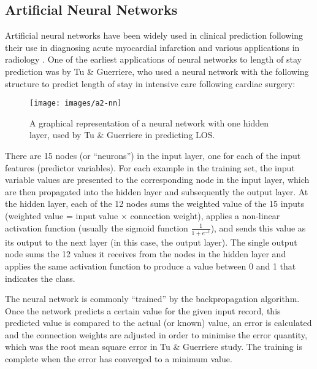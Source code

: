 \subsection{Artificial Neural Networks}
Artificial neural networks have been widely used in clinical prediction
following their use in diagnosing acute myocardial infarction and various
applications in radiology \citep{Baxt1995}.
One of the earliest applications of neural networks to
length of stay prediction was by Tu \& Guerriere, who used a neural network
with the following structure \citep{Tu1993} to predict length of stay in
intensive care following cardiac surgery:
\begin{figure}[h]
\centering
\texttt{[image: images/a2-nn]}
\caption{A graphical representation of a neural network with one hidden layer,
used by Tu \& Guerriere in predicting LOS.}
\end{figure}

There are 15 nodes (or ``neurons'') in the input layer, one for each of the
input features (predictor variables). For each example in the training set,
the input variable values are presented to the corresponding node in the input
layer, which are then propagated into the hidden layer and subsequently the
output layer. At the hidden layer, each of the 12 nodes sums the weighted
value of the 15 inputs (weighted value = input value $\times$ connection
weight), applies a non-linear activation function (usually the sigmoid function
$\frac{1}{1+e^{-t}}$), and sends this value as its output to the next layer
(in this case, the output layer). The single output node sums the 12 values
it receives from the nodes in the hidden layer and applies the same activation
function to produce a value between 0 and 1 that indicates the class.

The neural network is commonly ``trained'' by the backpropagation algorithm.
Once the network predicts a certain value for the given input record, this
predicted value is compared to the actual (or known) value, an error is
calculated and the connection weights are adjusted in order to minimise the
error quantity, which was the root mean square error in Tu \& Guerriere study.
The training is complete when the error has converged to a minimum value.

